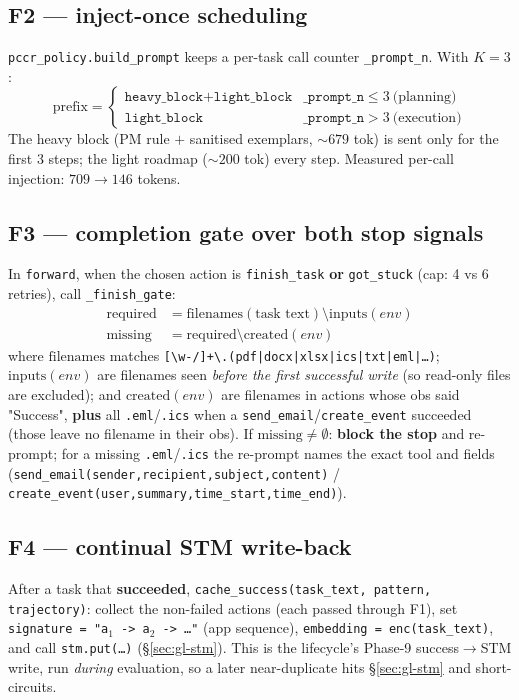 \subsection{F2 --- inject-once scheduling}
\label{sec:gl-f2}
\texttt{pccr\_policy.build\_prompt} keeps a per-task call counter \texttt{\_prompt\_n}. With
$K=3$:
\[
\text{prefix} =
\begin{cases}
\texttt{heavy\_block} + \texttt{light\_block} & \texttt{\_prompt\_n}\le 3 \ \text{(planning)}\\
\texttt{light\_block} & \texttt{\_prompt\_n} > 3 \ \text{(execution)}
\end{cases}
\]
The heavy block (PM rule $+$ sanitised exemplars, $\sim$$679$ tok) is sent only for the first 3 steps;
the light roadmap ($\sim$$200$ tok) every step. Measured per-call injection: $709\to146$ tokens.

\subsection{F3 --- completion gate over both stop signals}
\label{sec:gl-f3}
In \texttt{forward}, when the chosen action is \texttt{finish\_task} \textbf{or} \texttt{got\_stuck}
(cap: 4 vs 6 retries), call \texttt{\_finish\_gate}:
\begin{align*}
\text{required} &= \mathrm{filenames}(\text{task text}) \setminus \mathrm{inputs}(env)\\
\text{missing}  &= \text{required} \setminus \mathrm{created}(env)
\end{align*}
where $\mathrm{filenames}$ matches \texttt{[\textbackslash w-/]+\textbackslash.(pdf|docx|xlsx|ics|txt|eml|\dots)};
$\mathrm{inputs}(env)$ are filenames seen \emph{before the first successful write} (so read-only files
are excluded); and $\mathrm{created}(env)$ are filenames in actions whose obs said "Success", \textbf{plus}
all \texttt{.eml}/\texttt{.ics} when a \texttt{send\_email}/\texttt{create\_event} succeeded (those leave
no filename in their obs). If $\text{missing}\neq\emptyset$: \textbf{block the stop} and re-prompt; for
a missing \texttt{.eml}/\texttt{.ics} the re-prompt names the exact tool and fields
(\texttt{send\_email(sender,recipient,subject,content)} / \texttt{create\_event(user,summary,time\_start,time\_end)}).

\subsection{F4 --- continual STM write-back}
\label{sec:gl-f4}
After a task that \textbf{succeeded}, \texttt{cache\_success(task\_text, pattern, trajectory)}:
collect the non-failed actions (each passed through F1), set
\texttt{signature = "a$_1$ -> a$_2$ -> \dots"} (app sequence),
\texttt{embedding = enc(task\_text)}, and call \texttt{stm.put(\dots)} (\S\ref{sec:gl-stm}). This is the
lifecycle's Phase-9 success$\to$STM write, run \emph{during} evaluation, so a later near-duplicate hits
\S\ref{sec:gl-stm} and short-circuits.

